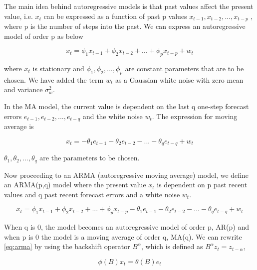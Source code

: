 The main idea behind autoregressive models is that past values affect the present value, i.e.
$x_{t}$ can be expressed as a function of past p values $ x_{t-1}, x_{t-2},...,x_{t-p} $ , where
p is the number of steps into the past. We can express an autoregressive model of order p as below

        \begin{equation} \label{eq:autoregressive}
          x_{t} = \phi_{1}x_{t-1} + \phi_{2}x_{t-2} + ... + \phi_{p}x_{t-p} + w_{t}
        \end{equation}

where $x_{t}$ is stationary and $\phi_{1}, \phi_{2},..., \phi_{p}$ are constant
parameters that are to be chosen. We have added the term $w_{t}$ as a Gaussian white noise with
zero mean and variance $\sigma^{2}_{w}$.

In the MA model, the current value is dependent on the last q one-step forecast errors
$e_{t-1}, e_{t-2},...,e_{t-q}$ and the white noise $w_{t}$. The expression for moving average
is

        \begin{equation} \label{eq:movingaverage}
          x_{t} = -\theta_{1}e_{t-1} - \theta_{2}e_{t-2} - ... - \theta_{q}e_{t-q} + w_{t}
        \end{equation}

$\theta_{1}, \theta_{2},..., \theta_{q}$ are the parameters to be chosen.

Now proceeding to an ARMA (autoregressive moving average) model, we define an ARMA(p,q) model
where the present value $x_{t}$ is dependent on p past recent values and q past recent forecast
errors and a white noise $w_{t}$.

        \begin{equation} \label{eq:arma}
          x_{t} = \phi_{1}x_{t-1} + \phi_{2}x_{t-2} + ... + \phi_{p}x_{t-p} - \theta_{1}e_{t-1}
          - \theta_{2}e_{t-2} - ... - \theta_{q}e_{t-q} + w_{t}
        \end{equation}

When q is 0, the model becomes an autoregressive model of order p, AR(p) and when p is 0 the model
is a moving average of order q, MA(q). We can rewrite \ref{eq:arma} by using the backshift
operator $B^{\alpha}$, which is defined as $B^{\alpha}z_{t} = z_{t-\alpha}$,

        \begin{equation} \label{eq:armarewrite}
          \phi(B)x_{t} = \theta(B)e_{t}
        \end{equation}

